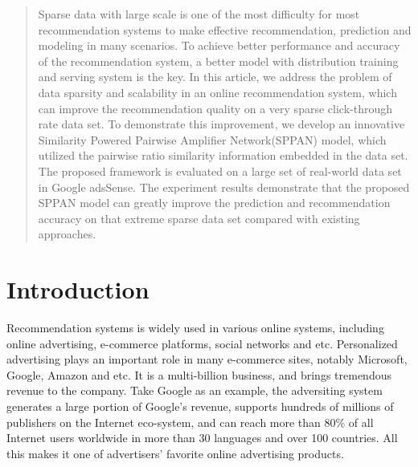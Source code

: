 \documentclass[conference,compsoc]{IEEEtran}
\begin{document}




\maketitle
\setlength\parindent{8pt}

\begin{abstract}
Sparse data with large scale is one of the most difficulty for most recommendation systems to make effective recommendation, prediction and modeling in many scenarios. To achieve better performance and accuracy of the recommendation system, a better model with distribution training and serving system is the key.  In this article, we address the problem of data sparsity and scalability in an online recommendation system, which can 
improve the recommendation quality on a very sparse click-through rate data set. To demonstrate this improvement, we develop an innovative Similarity Powered Pairwise Amplifier Network(SPPAN) model, which utilized the pairwise ratio similarity information embedded in the data set. The proposed framework is evaluated on a large set of real-world data set in Google adsSense. The experiment results demonstrate that the proposed SPPAN model can greatly improve the prediction and recommendation accuracy on that extreme sparse data set compared with existing approaches.
\end{abstract}





%
\IEEEpeerreviewmaketitle



%
\section{Introduction}
\label{sec:intro}

Recommendation systems is widely used in various online systems, including online advertising, e-commerce platforms, social networks and etc. Personalized advertising plays an important role in many e-commerce sites, notably Microsoft, Google, Amazon and etc.  It is a multi-billion business, and brings tremendous revenue to the company. Take Google as an example, the adversiting system generates a large portion of Google's revenue, supports hundreds of millions of publishers on the Internet eco-system, and can reach more than 80\% of all Internet users worldwide in more than 30 languages and over 100 countries. All this makes it one of advertisers' favorite online advertising products. 
\end{document}
